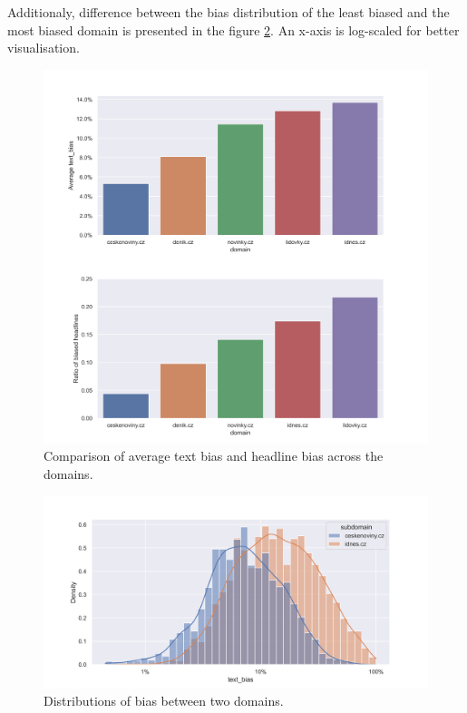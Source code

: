 Additionaly, difference between the bias distribution of the least biased and the most biased domain is presented in the figure \ref{fig:dists_ctk_idnes}. An x-axis is log-scaled for better visualisation.
\newpage


\begin{figure}

  \includegraphics[scale=0.5]{my_modules/multimedia/inference/domains.jpg}
  \caption{Comparison of average text bias and headline bias across the domains.}
  \label{fig:domains}

\end{figure}

\begin{figure}
  \includegraphics[scale=0.5]{my_modules/multimedia/inference/dists_ctk_idnes.png}
  \caption{Distributions of bias between two domains.}
  \label{fig:dists_ctk_idnes}
\end{figure}








